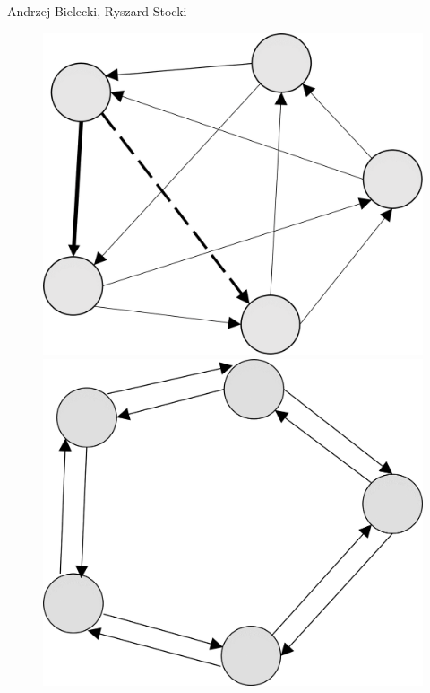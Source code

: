 \begin{artengenv2auth}{Andrzej Bielecki, Ryszard Stocki}
\begin{figure}[htbp]
 \centering %

 \begin{minipage}[b]{.45\textwidth}
   \centering
   \includegraphics[width=\textwidth]{ART_Bielecki/Figure_2_a_pu.png}
 \end{minipage}%
 \hfill
 \begin{minipage}[b]{.45\textwidth}
   \centering
   \includegraphics[width=\textwidth]{ART_Bielecki/Figure_2_b_pu.png}
 \end{minipage}


\end{figure}
\end{artengenv2auth}
